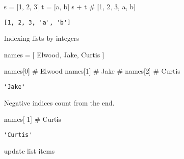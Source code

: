 \documentclass[
  letterpaper,
  DIV=11,
  numbers=noendperiod]{scrreprt}
\newenvironment{Shaded}{\begin{snugshade}}{\end{snugshade}}
\newcommand{\CommentTok}[1]{\textcolor[rgb]{0.37,0.37,0.37}{#1}}
\newcommand{\DecValTok}[1]{\textcolor[rgb]{0.68,0.00,0.00}{#1}}
\newcommand{\NormalTok}[1]{\textcolor[rgb]{0.00,0.46,0.62}{#1}}
\newcommand{\OperatorTok}[1]{\textcolor[rgb]{0.37,0.37,0.37}{#1}}
\newcommand{\NormalTok}[1]{\textcolor[rgb]{0.00,0.48,0.65}{#1}}
\newcommand{\OperatorTok}[1]{\textcolor[rgb]{0.37,0.37,0.37}{#1}}
\newcommand{\StringTok}[1]{\textcolor[rgb]{0.13,0.47,0.30}{#1}}
\begin{document}
\begin{Shaded}
\begin{Highlighting}[]
\begin{Shaded}
\begin{Highlighting}[]
\NormalTok{s }\OperatorTok{=}\NormalTok{ [}\DecValTok{1}\NormalTok{, }\DecValTok{2}\NormalTok{, }\DecValTok{3}\NormalTok{]}
\NormalTok{t }\OperatorTok{=}\NormalTok{ [}\StringTok{\textquotesingle{}a\textquotesingle{}}\NormalTok{, }\StringTok{\textquotesingle{}b\textquotesingle{}}\NormalTok{]}
\NormalTok{s }\OperatorTok{+}\NormalTok{ t           }\CommentTok{\# [1, 2, 3, \textquotesingle{}a\textquotesingle{}, \textquotesingle{}b\textquotesingle{}]}
\end{Highlighting}
\end{Shaded}

\begin{verbatim}
[1, 2, 3, 'a', 'b']
\end{verbatim}

Indexing lists by integers

\begin{Shaded}
\begin{Highlighting}[]
\NormalTok{names }\OperatorTok{=}\NormalTok{ [ }\StringTok{\textquotesingle{}Elwood\textquotesingle{}}\NormalTok{, }\StringTok{\textquotesingle{}Jake\textquotesingle{}}\NormalTok{, }\StringTok{\textquotesingle{}Curtis\textquotesingle{}}\NormalTok{ ]}

\NormalTok{names[}\DecValTok{0}\NormalTok{]  }\CommentTok{\# \textquotesingle{}Elwood\textquotesingle{}}
\NormalTok{names[}\DecValTok{1}\NormalTok{]  }\CommentTok{\# \textquotesingle{}Jake\textquotesingle{}}
\CommentTok{\# names[2]  \# \textquotesingle{}Curtis\textquotesingle{}}
\end{Highlighting}
\end{Shaded}

\begin{verbatim}
'Jake'
\end{verbatim}

Negative indices count from the end.

\begin{Shaded}
\begin{Highlighting}[]
\NormalTok{names[}\OperatorTok{{-}}\DecValTok{1}\NormalTok{] }\CommentTok{\# \textquotesingle{}Curtis\textquotesingle{}}
\end{Highlighting}
\end{Shaded}

\begin{verbatim}
'Curtis'
\end{verbatim}

update list items


\end{Highlighting}
\end{Shaded}
\end{document}
